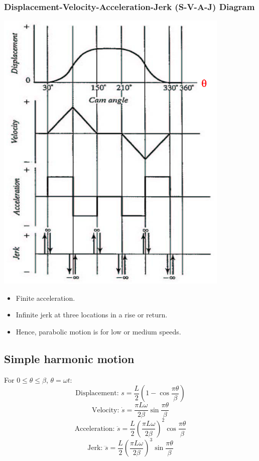 \documentclass[11pt]{article}
\begin{document}
\subsubsection{Displacement-Velocity-Acceleration-Jerk (S-V-A-J) Diagram}
\label{sec:orge294a15}
\begin{center}
\includegraphics[width=.9\linewidth]{./images/parabolic-motion-svaj-diagram.png}
\end{center}

\begin{itemize}
\item Finite acceleration.
\item Infinite jerk at three locations in a rise or return.
\item Hence, parabolic motion is for low or medium speeds.
\end{itemize}
\subsection{Simple harmonic motion}
\label{sec:orgaa1f904}
For \(0 \le \theta \le \beta\), \(\theta = \omega t\):
\[\text{Displacement: } s = \frac{L}{2} \left(1 - \cos \frac{\pi \theta}{\beta} \right)\]
\[\text{Velocity: } \dot{s} = \frac{\pi L \omega}{2 \beta} \sin \frac{\pi \theta}{\beta}\]
\[\text{Acceleration: } \ddot{s} = \frac{L}{2} \left(\frac{\pi L \omega}{2 \beta} \right)^2 \cos \frac{\pi \theta}{\beta}\]
\[\text{Jerk: } \dddot{s} = \frac{L}{2} \left(\frac{\pi L \omega}{2 \beta} \right)^3 \sin \frac{\pi \theta}{\beta}\]
\end{document}
